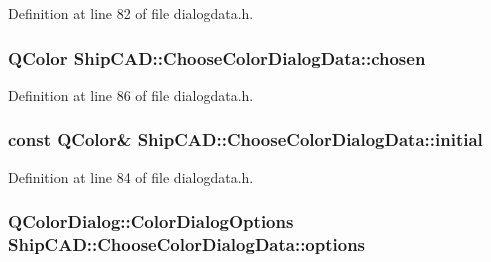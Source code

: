 Definition at line 82 of file dialogdata.\+h.

\subsubsection[{\texorpdfstring{chosen}{chosen}}]{\setlength{\rightskip}{0pt plus 5cm}Q\+Color Ship\+C\+A\+D\+::\+Choose\+Color\+Dialog\+Data\+::chosen}\hypertarget{structShipCAD_1_1ChooseColorDialogData_afa2fd53ceaab239e68818cb93463e247}{}\label{structShipCAD_1_1ChooseColorDialogData_afa2fd53ceaab239e68818cb93463e247}


Definition at line 86 of file dialogdata.\+h.

\subsubsection[{\texorpdfstring{initial}{initial}}]{\setlength{\rightskip}{0pt plus 5cm}const Q\+Color\& Ship\+C\+A\+D\+::\+Choose\+Color\+Dialog\+Data\+::initial}\hypertarget{structShipCAD_1_1ChooseColorDialogData_a63bc2080dc3d30fe9a448df004410c8b}{}\label{structShipCAD_1_1ChooseColorDialogData_a63bc2080dc3d30fe9a448df004410c8b}


Definition at line 84 of file dialogdata.\+h.

\subsubsection[{\texorpdfstring{options}{options}}]{\setlength{\rightskip}{0pt plus 5cm}Q\+Color\+Dialog\+::\+Color\+Dialog\+Options Ship\+C\+A\+D\+::\+Choose\+Color\+Dialog\+Data\+::options}\hypertarget{structShipCAD_1_1ChooseColorDialogData_ad0a90945a5a1942d892ca3a06dbd6545}{}\label{structShipCAD_1_1ChooseColorDialogData_ad0a90945a5a1942d892ca3a06dbd6545}


